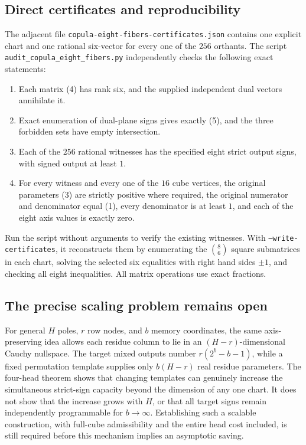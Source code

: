 \documentclass[11pt]{article}
\begin{document}
\subsection*{Direct certificates and reproducibility}
The adjacent file \texttt{copula-eight-fibers-certificates.json} contains
one explicit chart and one rational six-vector for every one of the
$256$ orthants. The script
\texttt{audit\_copula\_eight\_fibers.py} independently checks the
following exact statements:
\begin{enumerate}
\item Each matrix (4) has rank six, and the supplied independent
dual vectors annihilate it.
\item Exact enumeration of dual-plane signs gives exactly (5), and
the three forbidden sets have empty intersection.
\item Each of the $256$ rational witnesses has the specified eight
strict output signs, with signed output at least $1$.
\item For every witness and every one of the $16$ cube vertices,
the original parameters (3) are strictly positive where required,
the original numerator and denominator equal (1), every denominator
is at least $1$, and each of the eight axis values is exactly zero.
\end{enumerate}
Run the script without arguments to verify the existing witnesses.
With \texttt{--write-certificates}, it reconstructs them by enumerating
the $\binom86$ square submatrices in each chart, solving the selected
six equalities with right hand sides $\pm1$, and checking all eight
inequalities. All matrix operations use exact fractions.

\subsection*{The precise scaling problem remains open}
For general $H$ poles, $r$ row nodes, and $b$ memory coordinates,
the same axis-preserving idea allows each residue column to lie in an
$(H-r)$-dimensional Cauchy nullspace. The target mixed outputs number
$r(2^b-b-1)$, while a fixed permutation template supplies only
$b(H-r)$ real residue parameters. The four-head theorem shows that
changing templates can genuinely increase the simultaneous strict-sign
capacity beyond the dimension of any one chart. It does not show that
the increase grows with $H$, or that all target signs remain independently
programmable for $b\to\infty$. Establishing such a scalable construction,
with full-cube admissibility and the entire head cost included, is still
required before this mechanism implies an asymptotic saving.
\end{document}
